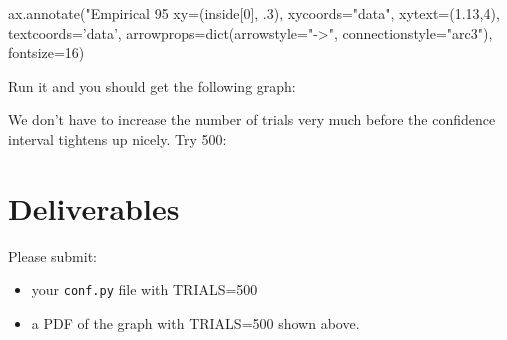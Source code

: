 \begin{fullwidth}
{\begin{pyverbatim}
ax.annotate("Empirical 95%
			 xy=(inside[0], .3),
			 xycoords="data",
			 xytext=(1.13,4), textcoords='data',
			 arrowprops=dict(arrowstyle="->",
                            connectionstyle="arc3"),
			 fontsize=16)
\end{pyverbatim}
}

\step Run it and you should get the following graph:


\step  We don't have to increase the number of trials very much before the confidence interval tightens up nicely. Try 500:


\section{Deliverables}

Please submit:

\begin{itemize}
\item your {\tt conf.py} file with TRIALS=500
\item a PDF of the graph with TRIALS=500 shown above.
\end{itemize}

\end{fullwidth}

